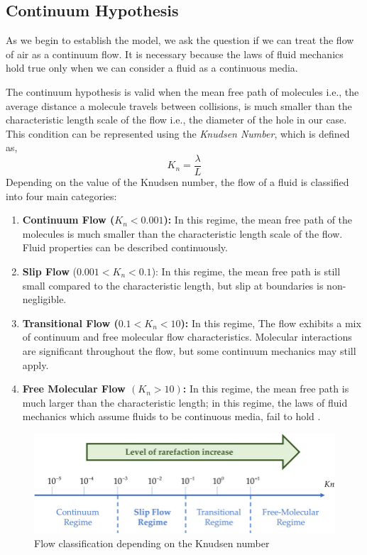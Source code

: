\documentclass[a4paper, 14pt]{extarticle}
\begin{document}
\subsection{Continuum Hypothesis}
As we begin to establish the model, we ask the question if we can treat the flow of air as a continuum flow. It is necessary because the laws of fluid mechanics hold true only when we can consider a fluid as a continuous media.

The continuum hypothesis is valid when the mean free path of molecules i.e., the average distance a molecule travels between collisions, is much smaller than the characteristic length scale of the flow i.e., the diameter of the hole in our case. This condition can be represented using the \textit{Knudsen Number}, which is defined as,
$$K_n = \frac{\lambda}{L}$$
Depending on the value of the Knudsen number, the flow of a fluid is classified into four main categories:
\begin{enumerate}
    \item \textbf{Continuum Flow ($K_n < 0.001$):}  In this regime, the mean free path of the molecules is much smaller than the characteristic length scale of the flow. Fluid properties can be described continuously.
    \item \textbf{Slip Flow} ($0.001 < K_n <0.1$): In this regime, the mean free path is still small compared to the characteristic length, but slip at boundaries is non-negligible.
    \item \textbf{Transitional Flow ($0.1 < K_n < 10$):} In this regime, The flow exhibits a mix of continuum and free molecular flow characteristics. Molecular interactions are significant throughout the flow, but some continuum mechanics may still apply.
    \item \textbf{Free Molecular Flow $(K_n > 10)$:} In this regime, the mean free path is much larger than the characteristic length; in this regime, the laws of fluid mechanics which assume fluids to be continuous media, fail to hold \citep{bird1994}.
\end{enumerate}
\begin{figure}[H]
\centering
\includegraphics[width=0.9\linewidth]{knudsen_number.jpg}
\caption{Flow classification depending on the Knudsen number}
\end{figure}
\end{document}
